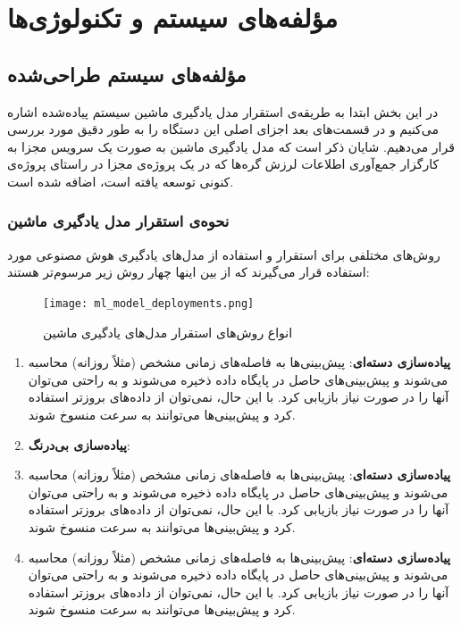 \chapter{مؤلفه‌های سیستم و تکنولوژی‌ها}

\section{مؤلفه‌های سیستم طراحی‌شده}
در این بخش ابتدا به طریقه‌ی استقرار مدل یادگیری ماشین سیستم پیاده‌شده اشاره می‌کنیم و در قسمت‌های بعد اجزای اصلی این دستگاه را به طور دقیق مورد بررسی قرار می‌دهیم. شایان ذکر است که مدل یادگیری ماشین به صورت یک سرویس مجزا به کارگزار جمع‌آوری اطلاعات لرزش گره‌ها که در یک پروژه‌ی مجزا در راستای پروژه‌ی کنونی توسعه یافته است، اضافه شده است.

\subsection{نحوه‌ی استقرار مدل یادگیری ماشین}
 روش‌های مختلفی برای استقرار و استفاده از مدل‌های یادگیری هوش مصنوعی مورد استفاده قرار می‌گیرند که از بین اینها چهار روش زیر مرسوم‌تر هستند\cite{singh2021deploy, pacheco2018towards}:

\begin{figure}[!h]
\centerline{\texttt{[image: ml\_model\_deployments.png]}}
\caption{انواع روش‌های استقرار مدل‌های یادگیری ماشین\cite{kaggleMLdeployments}}
\label{fig:ml_model_deployments}
\end{figure}

\begin{enumerate}

\item \textbf{پیاده‌سازی دسته‌ای}: پیش‌بینی‌ها به فاصله‌های زمانی مشخص (مثلاً روزانه) محاسبه می‌شوند و پیش‌بینی‌های حاصل در پایگاه داده ذخیره می‌شوند و به راحتی می‌توان آنها را در صورت نیاز بازیابی کرد. با این حال، نمی‌توان از داده‌های بروزتر استفاده کرد و پیش‌بینی‌ها می‌توانند به سرعت منسوخ شوند.

\item \textbf{پیاده‌سازی بی‌درنگ}:

\item \textbf{پیاده‌سازی دسته‌ای}: پیش‌بینی‌ها به فاصله‌های زمانی مشخص (مثلاً روزانه) محاسبه می‌شوند و پیش‌بینی‌های حاصل در پایگاه داده ذخیره می‌شوند و به راحتی می‌توان آنها را در صورت نیاز بازیابی کرد. با این حال، نمی‌توان از داده‌های بروزتر استفاده کرد و پیش‌بینی‌ها می‌توانند به سرعت منسوخ شوند.

\item \textbf{پیاده‌سازی دسته‌ای}: پیش‌بینی‌ها به فاصله‌های زمانی مشخص (مثلاً روزانه) محاسبه می‌شوند و پیش‌بینی‌های حاصل در پایگاه داده ذخیره می‌شوند و به راحتی می‌توان آنها را در صورت نیاز بازیابی کرد. با این حال، نمی‌توان از داده‌های بروزتر استفاده کرد و پیش‌بینی‌ها می‌توانند به سرعت منسوخ شوند.

\end{enumerate}

